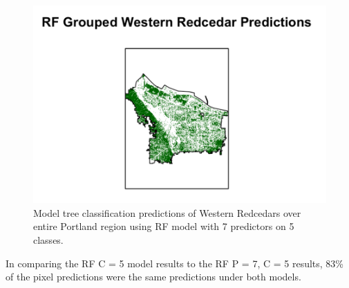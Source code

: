 \documentclass[12pt,twoside]{reedthesis}
\begin{document}
\begin{figure}

{\centering \includegraphics[width=1\linewidth]{figure/rfPortlandGroup} 

}

\caption{Model tree classification predictions of Western Redcedars over entire Portland region using RF model with 7 predictors on 5 classes.}\label{fig:rfPortlandGroup}
\end{figure}
In comparing the RF C = 5 model results to the RF P = 7, C = 5 results, 83\% of the pixel predictions were the same predictions under both models.
\end{document}

